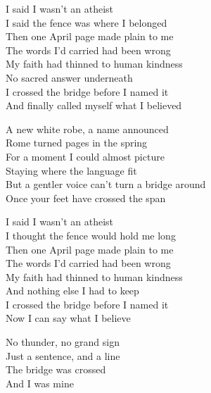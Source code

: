 \begin{lyrics}
I said I wasn’t an atheist\\
I said the fence was where I belonged\\
Then one April page made plain to me\\
The words I’d carried had been wrong\\
My faith had thinned to human kindness\\
No sacred answer underneath\\
I crossed the bridge before I named it\\
And finally called myself what I believed

A new white robe, a name announced\\
Rome turned pages in the spring\\
For a moment I could almost picture\\
Staying where the language fit\\
But a gentler voice can’t turn a bridge around\\
Once your feet have crossed the span

I said I wasn’t an atheist\\
I thought the fence would hold me long\\
Then one April page made plain to me\\
The words I’d carried had been wrong\\
My faith had thinned to human kindness\\
And nothing else I had to keep\\
I crossed the bridge before I named it\\
Now I can say what I believe

No thunder, no grand sign\\
Just a sentence, and a line\\
The bridge was crossed\\
And I was mine
\end{lyrics}


